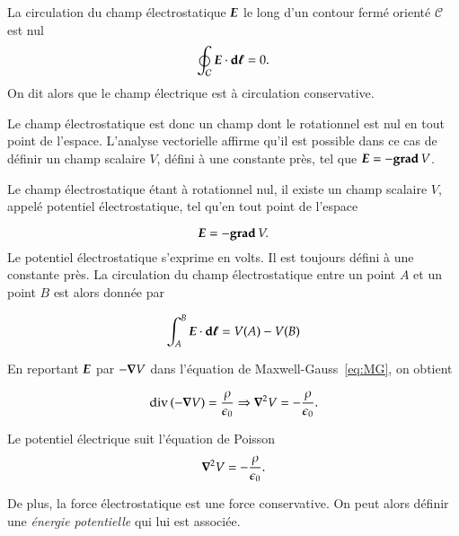 \begin{defn}
La circulation du champ électrostatique $\vece$ le long d'un contour fermé
orienté $\mathcal{C}$ est nul
\begin{equation}
	\oint_\mathcal{C} \vece \cdot \dl = 0.
\end{equation}
On dit alors que le champ électrique est à circulation conservative.
\end{defn}

Le champ électrostatique est donc un champ dont le rotationnel est nul en tout 
point de l'espace. L'analyse vectorielle affirme qu'il est possible dans ce cas 
de définir un champ scalaire $V$,
défini à une constante près, 
tel que $\vece = -\gradient V$.

\begin{defn}
	Le champ électrostatique étant à rotationnel nul, il existe un 
	champ scalaire $V$, appelé potentiel électrostatique, tel qu'en
	tout point de l'espace

	\begin{equation}
		\vece = -\gradient V.
		\label{eq:potentiel}
	\end{equation}
	Le potentiel électrostatique s'exprime en volts. Il est toujours défini
	à une constante près.
	La circulation du 
	champ électrostatique entre un point $A$ et un point $B$ est alors donnée
	par

	\begin{equation}
		\int_A^B \vece \cdot \dl = V(A) - V(B)
	\end{equation}
\end{defn}

En reportant $\vece$ par $-\grad V$ dans l'équation de 
Maxwell-Gauss~\ref{eq:MG}, on obtient

\begin{equation*}
	\div(-\grad V) = \dfrac{\rho}{\epsilon_0} \Rightarrow \laplacien V = 
	              -\dfrac{\rho}{\epsilon_0}.
\end{equation*}

\begin{defn}
	Le potentiel électrique suit l'équation de Poisson
	\begin{equation}
		\laplacien V = -\dfrac{\rho}{\epsilon_0}.
	\end{equation}
\end{defn}

De plus, la force électrostatique est une force conservative. On peut alors
définir une \emph{énergie potentielle} qui lui est associée.


